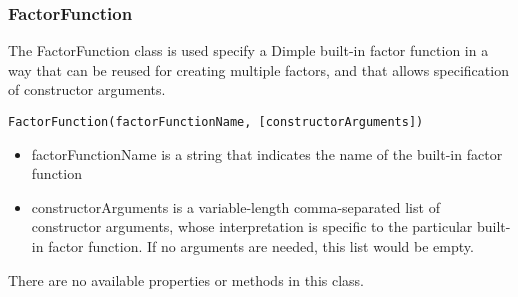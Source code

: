 \subsubsection{FactorFunction}
\label{sec:FactorFunction}

The FactorFunction class is used specify a Dimple built-in factor function in a way that can be reused for creating multiple factors, and that allows specification of constructor arguments.


\begin{lstlisting}
FactorFunction(factorFunctionName, [constructorArguments])
\end{lstlisting}

\begin{itemize}
\item factorFunctionName is a string that indicates the name of the built-in factor function
\item constructorArguments is a variable-length comma-separated list of constructor arguments, whose interpretation is specific to the particular built-in factor function.  If no arguments are needed, this list would be empty.
\end{itemize}

There are no available properties or methods in this class.



